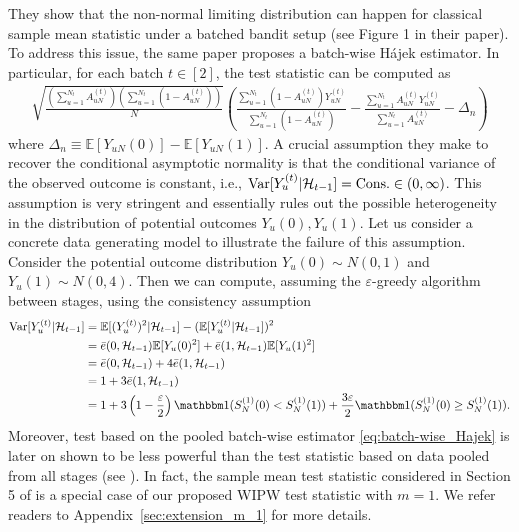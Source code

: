 \documentclass[12pt]{article}
\newcommand{\E}{\mathbb E}								%
\newcommand{\indicator}{\mathbbm 1}						%
\begin{document}
They show that the non-normal limiting distribution can happen for classical sample mean statistic under a batched bandit setup (see Figure 1 in their paper). To address this issue, the same paper proposes a batch-wise H\'{a}jek estimator. In particular, for each batch $t\in[2]$, the test statistic can be computed as
\small 
\begin{align}\label{eq:batch-wise_Hajek}
	\sqrt{\frac{(\sum_{u=1}^{N_t}A_{uN}^{(t)})(\sum_{u=1}^{N_t}(1-A_{uN}^{(t)}))}{N}}\left(\frac{\sum_{u=1}^{N_t}(1-A_{uN}^{(t)})Y_{uN}^{(t)}}{\sum_{u=1}^{N_t}(1-A_{uN}^{(t)})}-\frac{\sum_{u=1}^{N_t}A_{uN}^{(t)}Y_{uN}^{(t)}}{\sum_{u=1}^{N_t}A_{uN}^{(t)}}-\Delta_n\right)
\end{align}
\normalsize
where $\Delta_n\equiv \E[Y_{uN}(0)]-\E[Y_{uN}(1)]$. A crucial assumption they make to recover the conditional asymptotic normality is that the conditional variance of the observed outcome is constant, i.e., $\mathrm{Var}[Y_{u}^{(t)}|\mathcal{H}_{t-1}]=\textnormal{Cons.}\in (0,\infty)$. This assumption is very stringent and essentially rules out the possible heterogeneity in the distribution of potential outcomes $Y_{u}(0),Y_{u}(1)$. Let us consider a concrete data generating model to illustrate the failure of this assumption. Consider the potential outcome distribution $Y_{u}(0)\sim N(0,1)$ and $Y_u(1)\sim N(0,4)$. Then we can compute, assuming the $\varepsilon$-greedy algorithm between stages, using the consistency assumption
\begin{align*}
	\mathrm{Var}[Y_{u}^{(t)}|\mathcal{H}_{t-1}]
	&
	=\E[(Y_{u}^{(t)})^2|\mathcal{H}_{t-1}]-(\E[Y_{u}^{(t)}|\mathcal{H}_{t-1}])^2\\
	&
	=\bar e(0,\mathcal{H}_{t-1})\E[Y_u(0)^2]+\bar e(1,\mathcal{H}_{t-1})\E[Y_u(1)^2]\\
	&
	=\bar e(0,\mathcal{H}_{t-1})+4\bar e(1,\mathcal{H}_{t-1})\\
	&
	=1+3\bar e(1,\mathcal{H}_{t-1})\\
	&
	=1 + 3\left(1-\frac{\varepsilon}{2}\right)\indicator(S_N^{(1)}(0)<S_N^{(1)}(1))+\frac{3\varepsilon}{2}\indicator(S_N^{(1)}(0)\geq S_N^{(1)}(1)).
\end{align*}
Moreover, test based on the pooled batch-wise estimator \eqref{eq:batch-wise_Hajek} is later on shown to be less powerful than the test statistic based on data pooled from all stages (see \citet{Hirano2023}). In fact, the sample mean test statistic considered in Section 5 of \citet{Hirano2023} is a special case of our proposed WIPW test statistic with $m=1$. We refer readers to Appendix~\ref{sec:extension_m_1} for more details.
\end{document}
